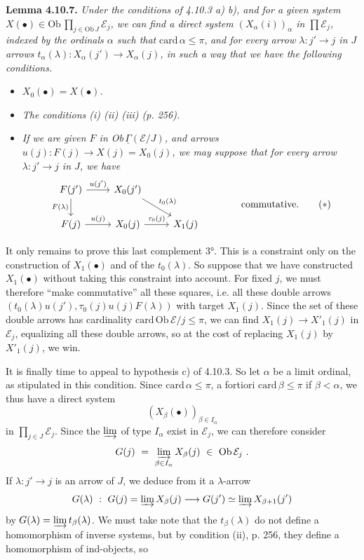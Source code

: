 \documentclass[11pt]{article}
\newcommand{\msp}[1]{\marginpar{\footnotesize [#1]}}
\newcommand{\uGamma}{\underline{\Gamma}}
\newcommand{\Ob}{\mathrm{Ob}\,}
\newcommand{\card}{\mathrm{card}\,}
\begin{document}
\textbf{Lemma 4.10.7.} \textit{Under the conditions of 4.10.3 a) b), and for a given system $X(\bullet)\in\Ob\prod_{j\in\Ob J}\mathcal{E}_j$, we can find a direct system $(X_\alpha(i))_\alpha$ in $\prod\mathcal{E}_j$, indexed by the ordinals $\alpha$ such that} $\card\alpha\leqslant\pi$, \textit{and for every arrow $\lambda : j'\longrightarrow j$ in $J$ arrows $t_\alpha(\lambda) : X_\alpha(j')\longrightarrow X_\alpha(j)$, in such a way that we have the following conditions.} %
\begin{itemize}[leftmargin=3em]
\item[\textit{1°)}] \textit{$X_0(\bullet)=X(\bullet)$.}
\item[\textit{2°)}] \textit{The conditions (i) (ii) (iii) (p. 256).}
\item[\textit{3°)}] \textit{If we are given $F$ in \textup{Ob}$\,\uGamma(\mathcal{E}/J)$, and arrows $u(j) : F(j)\longrightarrow X(j)=X_0(j)$, we may suppose that for every arrow $\lambda : j'\longrightarrow j$ in $J$, we have}
\[
\begin{tikzcd}
F(j') \arrow[r,"u(j')"] \arrow[d,"F(\lambda)"'] & X_0(j') \arrow[dr,"t_0(\lambda)"] & \\
F(j) \arrow[r,"u(j)"] & X_0(j) \arrow[r,"\tau_0(j)"] & X_1(j)
\end{tikzcd}
\qquad\qquad \text{commutative.}
\tag*{$(*)$}
\]
\end{itemize}

\msp{260}
It only remains to prove this last complement 3°. This is a constraint only on the construction of $X_1(\bullet)$ and of the $t_0(\lambda)$. So suppose that we have constructed $X_1(\bullet)$ without taking this constraint into account. For fixed $j$, we must therefore ``make commutative'' all these squares, i.e. all these double arrows $(t_0(\lambda)u(j'),\tau_0(j)u(j)F(\lambda))$ with target $X_1(j)$. Since the set of these double arrows has cardinality $\card\Ob\mathcal{E}/j\leqslant\pi$, we can find $X_1(j)\longrightarrow X'_1(j)$ in $\mathcal{E}_j$, equalizing all these double arrows, so at the cost of replacing $X_1(j)$ by $X'_1(j)$, we win.

\msp{261}
It is finally time to appeal to hypothesis c) of 4.10.3. So let $\alpha$ be a limit ordinal, as stipulated in this condition. Since $\card\alpha\leqslant\pi$, a fortiori $\card\beta\leqslant\pi$ if $\beta<\alpha$, we thus have a direct system
\[
(X_\beta(\bullet))_{\beta\in I_\alpha}
\]
in $\prod_{j\in J}\mathcal{E}_j$. Since the $\varinjlim$ of type $I_\alpha$ exist in $\mathcal{E}_j$, we can therefore consider
\[
G(j)\ =\ \varinjlim_{\beta\in I_\alpha} X_\beta(j)\ \in\ \Ob\mathcal{E}_j\ .
\]
If $\lambda : j'\longrightarrow j$ is an arrow of $J$, we deduce from it a $\lambda$-arrow
\[
G(\lambda)\ :\ G(j)=\varinjlim X_\beta(j) \longrightarrow G(j')\simeq\varinjlim X_{\beta+1}(j')
\]
by $G(\lambda)=\varinjlim t_\beta(\lambda)$. We must
\msp{262}
take note that the $t_\beta(\lambda)$ do not define a homomorphism of inverse systems, but by condition (ii), p. 256, they define a homomorphism of ind-objects, so
\end{document}
